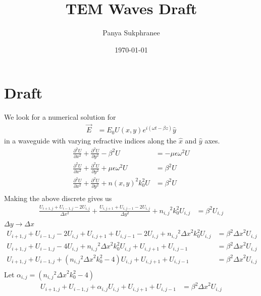 \documentclass[letter]{article}
\title{TEM Waves Draft}
\author{Panya Sukphranee}
\date{\today}
\begin{document}
\maketitle

\section{Draft}
	
	\indent We look for a numerical solution for \\
	\begin{align*}
		\vec{E} &=  E_0 U(x, y) e^{i(\omega t - \beta z)} \hat{y}
	\end{align*}
	in a waveguide with varying refractive indices along the $\hat{x}$ and $\hat{y}$ axes.
	\begin{align*}
		\frac{\partial^2 U}{\partial x^2} + \frac{\partial^2 U}{\partial y^2} - \beta^2 U &= - \mu \epsilon \omega^2 U \\
		\frac{\partial^2 U}{\partial x^2} + \frac{\partial^2 U}{\partial y^2} + \mu \epsilon \omega^2 U &= \beta^2 U \\
		\frac{\partial^2 U}{\partial x^2} + \frac{\partial^2 U}{\partial y^2} + n(x,y)^2 k_0^2 U &= \beta^2 U \\
	\end{align*}		
	Making the above discrete gives us\\
	\begin{align*}
		\frac{U_{i+1, j} + U_{i-1,j} - 2U_{i,j}}{\Delta x^2} + \frac{U_{i, j+1} + U_{i,j-1} - 2U_{i,j}}{\Delta y^2}
			+ {n_{i,j}}^2 k_0^2 U_{i,j} &= \beta^2 U_{i,j} \\
	\end{align*}
	$\Delta y \rightarrow \Delta x$
	\begin{align*}
		U_{i+1, j} + U_{i-1,j} - 2U_{i,j} + U_{i, j+1} + U_{i,j-1} - 2U_{i,j}
			+ {n_{i,j}}^2 {\Delta x}^2 k_0^2 U_{i,j} &= \beta^2 {\Delta x}^2 U_{i,j} \\
		U_{i+1, j} + U_{i-1,j} - 4U_{i,j} + {n_{i,j}}^2 {\Delta x}^2 k_0^2 U_{i,j} + U_{i, j+1} + U_{i,j-1} 
					 &= \beta^2 {\Delta x}^2 U_{i,j} \\
		U_{i+1, j} + U_{i-1,j} + ({n_{i,j}}^2 {\Delta x}^2 k_0^2 - 4)U_{i,j} + U_{i, j+1} + U_{i,j-1} 
					 &= \beta^2 {\Delta x}^2 U_{i,j} \\
	\end{align*}
	Let $\alpha_{i,j} =({n_{i,j}}^2 {\Delta x}^2 k_0^2 - 4)$\\
	\begin{align}
		\label{eqn:U}
		U_{i+1, j} + U_{i-1,j} + \alpha_{i,j}U_{i,j} + U_{i, j+1} + U_{i,j-1} 
					 &= \beta^2 {\Delta x}^2 U_{i,j}
	\end{align}
\end{document}

